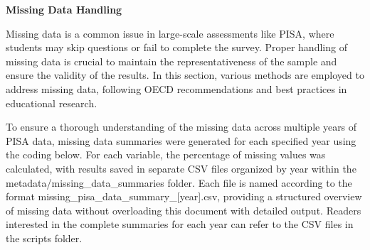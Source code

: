 \documentclass[
]{article}
\begin{document}
\textbf{Missing Data Handling}

Missing data is a common issue in large-scale assessments like PISA,
where students may skip questions or fail to complete the survey. Proper
handling of missing data is crucial to maintain the representativeness
of the sample and ensure the validity of the results. In this section,
various methods are employed to address missing data, following OECD
recommendations and best practices in educational research.

To ensure a thorough understanding of the missing data across multiple
years of PISA data, missing data summaries were generated for each
specified year using the coding below. For each variable, the percentage
of missing values was calculated, with results saved in separate CSV
files organized by year within the metadata/missing\_data\_summaries
folder. Each file is named according to the format
missing\_pisa\_data\_summary\_{[}year{]}.csv, providing a structured
overview of missing data without overloading this document with detailed
output. Readers interested in the complete summaries for each year can
refer to the CSV files in the scripts folder.
\end{document}
